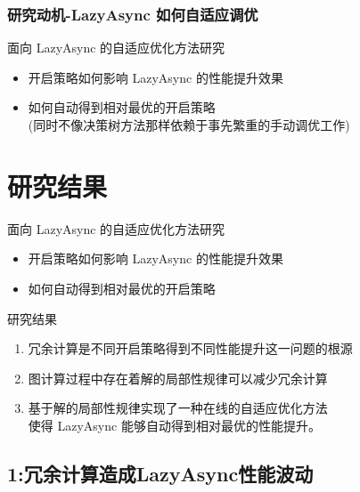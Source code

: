 \documentclass[10pt]{beamer}
\begin{document}
\begin{frame}%
  \frametitle{研究动机-LazyAsync 如何自适应调优}
  \begin{block}
    {面向 LazyAsync 的自适应优化方法研究}
    \begin{itemize}
      \item 开启策略如何影响 LazyAsync 的性能提升效果
      \item 如何自动得到相对最优的开启策略\\
      (同时不像决策树方法那样依赖于事先繁重的手动调优工作)
    \end{itemize}
  \end{block}
\end{frame}


\section{研究结果}

\begin{frame}
  \begin{block}
    {面向 LazyAsync 的自适应优化方法研究}
    \begin{itemize}
      \item 开启策略如何影响 LazyAsync 的性能提升效果
      \item 如何自动得到相对最优的开启策略
    \end{itemize}
  \end{block}
  \begin{block}
    {研究结果}
    \begin{enumerate}
      \item 冗余计算是不同开启策略得到不同性能提升这一问题的根源
      \item 图计算过程中存在着解的局部性规律可以减少冗余计算
      \item 基于解的局部性规律实现了一种在线的自适应优化方法\\
      使得 LazyAsync 能够自动得到相对最优的性能提升。
    \end{enumerate}
  \end{block}
\end{frame}
\subsection{1:冗余计算造成LazyAsync性能波动}
\end{document}
